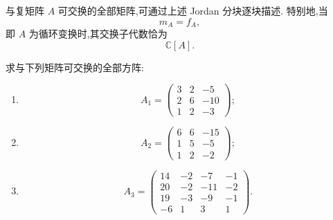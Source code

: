 \begin{theorem}[\marktwostar]
与复矩阵 $A$ 可交换的全部矩阵,可通过上述 Jordan 分块逐块描述.
特别地,当
\[
m_A=f_A,
\]
即 $A$ 为循环变换时,其交换子代数恰为
\[
\boxed{\mathbb{C}[A]}.
\]
\end{theorem}


\begin{example}
求与下列矩阵可交换的全部方阵:
\begin{enumerate}
    \item
    \[
    A_1=
    \begin{pmatrix}
    3&2&-5\\
    2&6&-10\\
    1&2&-3
    \end{pmatrix};
    \]
    \item
    \[
    A_2=
    \begin{pmatrix}
    6&6&-15\\
    1&5&-5\\
    1&2&-2
    \end{pmatrix};
    \]
    \item
    \[
    A_3=
    \begin{pmatrix}
    14&-2&-7&-1\\
    20&-2&-11&-2\\
    19&-3&-9&-1\\
    -6&1&3&1
    \end{pmatrix}.
    \]
\end{enumerate}
\end{example}
\exampleblank

